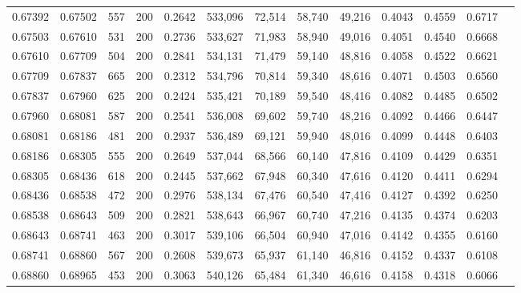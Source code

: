 \begin{tabular}{rrrrrrrrrrrrr}
0.67392 & 0.67502 &    557 & 200 &                                     0.2642 & 533,096 &  72,514 &  58,740 &  49,216 & 0.4043 & 0.4559 & 0.6717 \\
0.67503 & 0.67610 &    531 & 200 &                                     0.2736 & 533,627 &  71,983 &  58,940 &  49,016 & 0.4051 & 0.4540 & 0.6668 \\
0.67610 & 0.67709 &    504 & 200 &                                     0.2841 & 534,131 &  71,479 &  59,140 &  48,816 & 0.4058 & 0.4522 & 0.6621 \\
0.67709 & 0.67837 &    665 & 200 &                                     0.2312 & 534,796 &  70,814 &  59,340 &  48,616 & 0.4071 & 0.4503 & 0.6560 \\
0.67837 & 0.67960 &    625 & 200 &                                     0.2424 & 535,421 &  70,189 &  59,540 &  48,416 & 0.4082 & 0.4485 & 0.6502 \\
0.67960 & 0.68081 &    587 & 200 &                                     0.2541 & 536,008 &  69,602 &  59,740 &  48,216 & 0.4092 & 0.4466 & 0.6447 \\
0.68081 & 0.68186 &    481 & 200 &                                     0.2937 & 536,489 &  69,121 &  59,940 &  48,016 & 0.4099 & 0.4448 & 0.6403 \\
0.68186 & 0.68305 &    555 & 200 &                                     0.2649 & 537,044 &  68,566 &  60,140 &  47,816 & 0.4109 & 0.4429 & 0.6351 \\
0.68305 & 0.68436 &    618 & 200 &                                     0.2445 & 537,662 &  67,948 &  60,340 &  47,616 & 0.4120 & 0.4411 & 0.6294 \\
0.68436 & 0.68538 &    472 & 200 &                                     0.2976 & 538,134 &  67,476 &  60,540 &  47,416 & 0.4127 & 0.4392 & 0.6250 \\
0.68538 & 0.68643 &    509 & 200 &                                     0.2821 & 538,643 &  66,967 &  60,740 &  47,216 & 0.4135 & 0.4374 & 0.6203 \\
0.68643 & 0.68741 &    463 & 200 &                                     0.3017 & 539,106 &  66,504 &  60,940 &  47,016 & 0.4142 & 0.4355 & 0.6160 \\
0.68741 & 0.68860 &    567 & 200 &                                     0.2608 & 539,673 &  65,937 &  61,140 &  46,816 & 0.4152 & 0.4337 & 0.6108 \\
0.68860 & 0.68965 &    453 & 200 &                                     0.3063 & 540,126 &  65,484 &  61,340 &  46,616 & 0.4158 & 0.4318 & 0.6066 \\

\end{tabular}
